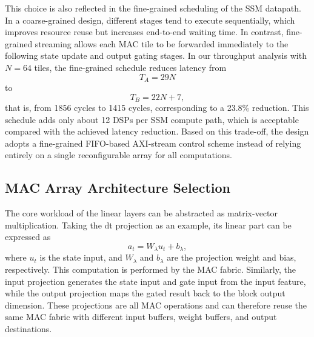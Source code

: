 \documentclass[11pt,twoside]{eitExjobb}
\begin{document}
This choice is also reflected in the fine-grained scheduling of the SSM datapath. In a
coarse-grained design, different stages tend to execute sequentially, which improves
resource reuse but increases end-to-end waiting time. In contrast, fine-grained
streaming allows each MAC tile to be forwarded immediately to the following state
update and output gating stages. In our throughput analysis with $N=64$ tiles, the
fine-grained schedule reduces latency from
\begin{equation}
T_A = 29N
\label{eq:coarse_latency}
\end{equation}
to
\begin{equation}
T_B = 22N + 7,
\label{eq:fine_latency}
\end{equation}
that is, from 1856 cycles to 1415 cycles, corresponding to a 23.8\% reduction. This
schedule adds only about 12 DSPs per SSM compute path, which is acceptable compared
with the achieved latency reduction. Based on this trade-off, the design adopts a
fine-grained FIFO-based AXI-stream control scheme instead of relying entirely on a
single reconfigurable array for all computations.

\subsection{MAC Array Architecture Selection}

The core workload of the linear layers can be abstracted as matrix-vector
multiplication. Taking the dt projection as an example, its linear part can be
expressed as
\begin{equation}
a_t = W_{\lambda}u_t + b_{\lambda},
\label{eq:update_gate_projection_linear}
\end{equation}
where $u_t$ is the state input, and $W_{\lambda}$ and $b_{\lambda}$ are the projection
weight and bias, respectively. This computation is performed by the MAC fabric.
Similarly, the input projection generates the state input and gate input from the input
feature, while the output projection maps the gated result back to the block output
dimension. These projections are all MAC operations and can therefore reuse the same
MAC fabric with different input buffers, weight buffers, and output destinations.
\end{document}
